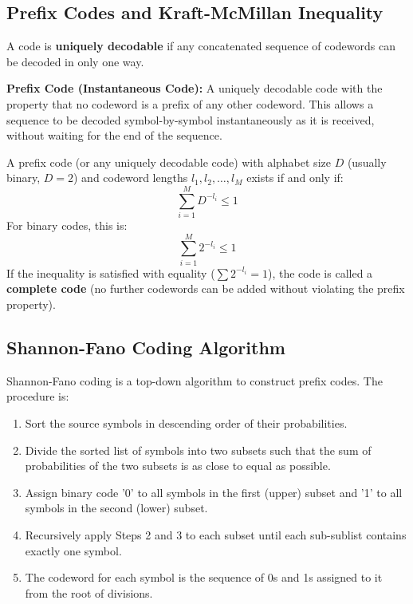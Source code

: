 \documentclass[12pt,a4paper]{article}
\begin{document}
\subsection{Prefix Codes and Kraft-McMillan Inequality}
A code is \textbf{uniquely decodable} if any concatenated sequence of codewords can be decoded in only one way.
\begin{tcolorbox}[defbox]
\textbf{Prefix Code (Instantaneous Code):} A uniquely decodable code with the property that no codeword is a prefix of any other codeword. This allows a sequence to be decoded symbol-by-symbol instantaneously as it is received, without waiting for the end of the sequence.
\end{tcolorbox}

\begin{tcolorbox}[formulabox, title={\textbf{Kraft-McMillan Inequality}}]
A prefix code (or any uniquely decodable code) with alphabet size $D$ (usually binary, $D=2$) and codeword lengths $l_1, l_2, \dots, l_M$ exists if and only if:
\begin{equation}
  \sum_{i=1}^M D^{-l_i} \le 1
\end{equation}
For binary codes, this is:
\begin{equation}
  \sum_{i=1}^M 2^{-l_i} \le 1
\end{equation}
If the inequality is satisfied with equality ($\sum 2^{-l_i} = 1$), the code is called a \textbf{complete code} (no further codewords can be added without violating the prefix property).
\end{tcolorbox}

\subsection{Shannon-Fano Coding Algorithm}
Shannon-Fano coding is a top-down algorithm to construct prefix codes. The procedure is:
\begin{enumerate}[label=\textbf{Step \arabic*:}, leftmargin=4.5em, itemsep=3pt]
  \item Sort the source symbols in descending order of their probabilities.
  \item Divide the sorted list of symbols into two subsets such that the sum of probabilities of the two subsets is as close to equal as possible.
  \item Assign binary code '0' to all symbols in the first (upper) subset and '1' to all symbols in the second (lower) subset.
  \item Recursively apply Steps 2 and 3 to each subset until each sub-sublist contains exactly one symbol.
  \item The codeword for each symbol is the sequence of 0s and 1s assigned to it from the root of divisions.
\end{enumerate}
\end{document}
